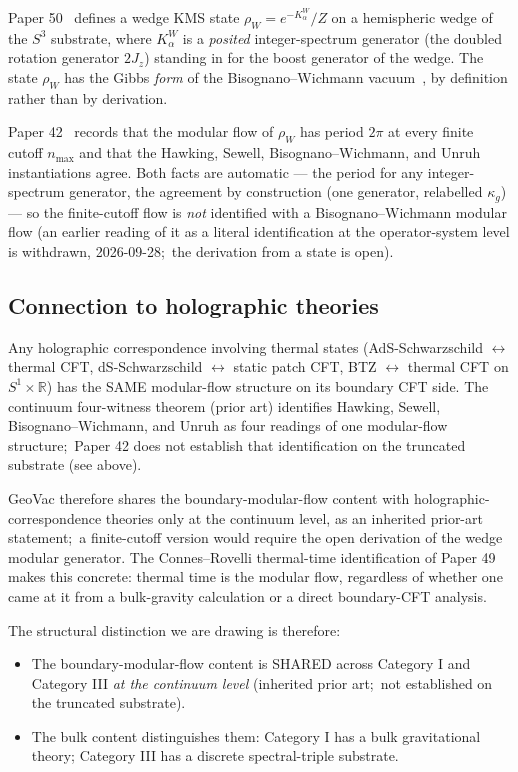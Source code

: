\documentclass[11pt,a4paper]{article}
\theoremstyle{plain}
\theoremstyle{definition}
\newcommand{\nmax}{n_{\max}}
\newcommand{\sthree}{S^{3}}
\newcommand{\R}{\mathbb{R}}
\newcommand{\Kalpha}{K_{\alpha}^{W}}
\newcommand{\rhoW}{\rho_{W}}
\begin{document}
Paper 50~\cite{paper50} defines a wedge KMS state $\rhoW = e^{-\Kalpha} / Z$
on a hemispheric wedge of the $\sthree$ substrate, where $\Kalpha$ is
a \emph{posited} integer-spectrum generator (the doubled rotation
generator $2J_z$) standing in for the boost generator of the wedge.
The state $\rhoW$ has the Gibbs \emph{form} of the
Bisognano--Wichmann vacuum~\cite{bisognano_wichmann1976}, by
definition rather than by derivation.

Paper 42~\cite{paper42} records that the modular flow of $\rhoW$ has
period $2\pi$ at every finite cutoff $\nmax$ and that the Hawking,
Sewell, Bisognano--Wichmann, and Unruh instantiations agree.  Both
facts are automatic --- the period for any integer-spectrum generator,
the agreement by construction (one generator, relabelled $\kappa_g$)
--- so the finite-cutoff flow is \emph{not} identified with a
Bisognano--Wichmann modular flow (an earlier reading of it as a
literal identification at the operator-system level is withdrawn, %
2026-09-28;\ the derivation from a state is open).

\subsection{Connection to holographic theories}

Any holographic correspondence involving thermal states
(AdS-Schwarzschild $\leftrightarrow$ thermal CFT, dS-Schwarzschild
$\leftrightarrow$ static patch CFT, BTZ $\leftrightarrow$ thermal
CFT on $S^{1} \times \R$) has the SAME modular-flow structure on its
boundary CFT side. The continuum four-witness theorem (prior art)
identifies Hawking, Sewell, Bisognano--Wichmann, and Unruh as four
readings of one modular-flow structure;\ Paper 42 does not establish
that identification on the truncated substrate (see above).

GeoVac therefore shares the boundary-modular-flow content with
holographic-correspondence theories only at the continuum level, as
an inherited prior-art statement;\ a finite-cutoff version would
require the open derivation of the wedge modular generator. The Connes--Rovelli thermal-time
identification of Paper 49~\cite{paper49} makes this concrete:
thermal time is the modular flow, regardless of whether one came at
it from a bulk-gravity calculation or a direct boundary-CFT analysis.

The structural distinction we are drawing is therefore:
\begin{itemize}
\item The boundary-modular-flow content is SHARED across Category I
and Category III \emph{at the continuum level} (inherited prior art;\
not established on the truncated substrate).
\item The bulk content distinguishes them: Category I has a bulk
gravitational theory; Category III has a discrete spectral-triple
substrate.
\end{itemize}
\end{document}
